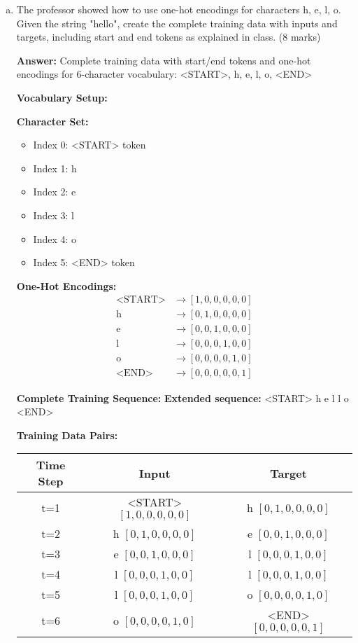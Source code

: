 \documentclass[12pt]{article}
\newcommand{\answer}[1]{{\color{answercolor}\textbf{Answer:} #1}}
\newcommand{\explanation}[1]{{\color{explanationcolor}#1}}
\begin{document}
\begin{enumerate}[(a)]
    \item The professor showed how to use one-hot encodings for characters h, e, l, o. Given the string "hello", create the complete training data with inputs and targets, including start and end tokens as explained in class. \hfill (8 marks)
    
    \answer{Complete training data with start/end tokens and one-hot encodings for 6-character vocabulary: <START>, h, e, l, o, <END>}
    
    \explanation{
    \textbf{Vocabulary Setup:}
    
    \textbf{Character Set:}
    \begin{itemize}
        \item Index 0: <START> token
        \item Index 1: h
        \item Index 2: e  
        \item Index 3: l
        \item Index 4: o
        \item Index 5: <END> token
    \end{itemize}
    
    \textbf{One-Hot Encodings:}
    \begin{align}
    \text{<START>} &\rightarrow [1, 0, 0, 0, 0, 0] \\
    \text{h} &\rightarrow [0, 1, 0, 0, 0, 0] \\
    \text{e} &\rightarrow [0, 0, 1, 0, 0, 0] \\
    \text{l} &\rightarrow [0, 0, 0, 1, 0, 0] \\
    \text{o} &\rightarrow [0, 0, 0, 0, 1, 0] \\
    \text{<END>} &\rightarrow [0, 0, 0, 0, 0, 1]
    \end{align}
    
    \textbf{Complete Training Sequence:}
    \textbf{Extended sequence:} <START> h e l l o <END>
    
    \textbf{Training Data Pairs:}
    \begin{center}
    \begin{tabular}{|c|c|c|}
    \hline
    \textbf{Time Step} & \textbf{Input} & \textbf{Target} \\
    \hline
    t=1 & <START> $[1,0,0,0,0,0]$ & h $[0,1,0,0,0,0]$ \\
    t=2 & h $[0,1,0,0,0,0]$ & e $[0,0,1,0,0,0]$ \\
    t=3 & e $[0,0,1,0,0,0]$ & l $[0,0,0,1,0,0]$ \\
    t=4 & l $[0,0,0,1,0,0]$ & l $[0,0,0,1,0,0]$ \\
    t=5 & l $[0,0,0,1,0,0]$ & o $[0,0,0,0,1,0]$ \\
    t=6 & o $[0,0,0,0,1,0]$ & <END> $[0,0,0,0,0,1]$ \\
    \hline
    \end{tabular}
    \end{center}
    
}
\end{enumerate}
\end{document}
